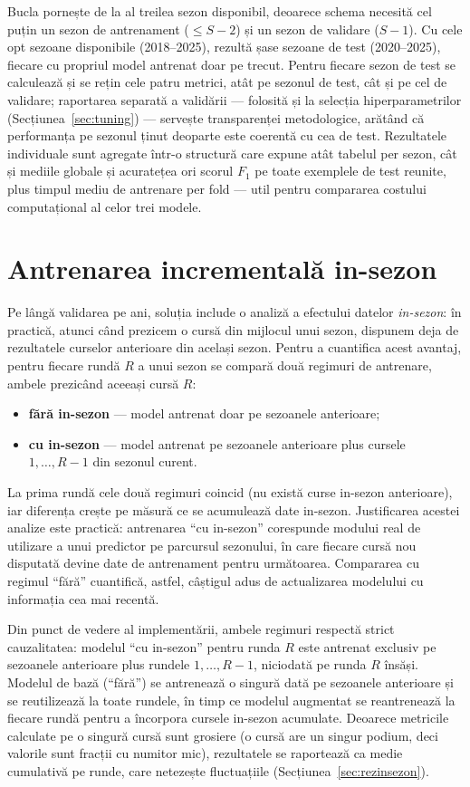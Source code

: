 \documentclass[12pt,a4paper]{report}
\begin{document}
Bucla pornește de la al treilea sezon disponibil, deoarece schema necesită cel puțin un sezon de
antrenament ($\leq S-2$) și un sezon de validare ($S-1$). Cu cele opt sezoane disponibile
(2018--2025), rezultă șase sezoane de test (2020--2025), fiecare cu propriul model antrenat doar pe
trecut. Pentru fiecare sezon de test se calculează și se rețin cele patru metrici, atât pe sezonul
de test, cât și pe cel de validare; raportarea separată a validării --- folosită și la selecția
hiperparametrilor (Secțiunea~\ref{sec:tuning}) --- servește transparenței metodologice, arătând că
performanța pe sezonul ținut deoparte este coerentă cu cea de test. Rezultatele individuale sunt
agregate într-o structură care expune atât tabelul per sezon, cât și mediile globale și acuratețea
ori scorul $F_1$ pe toate exemplele de test reunite, plus timpul mediu de antrenare per fold ---
util pentru compararea costului computațional al celor trei modele.

\section{Antrenarea incrementală in-sezon}
\label{sec:insezon}

Pe lângă validarea pe ani, soluția include o analiză a efectului datelor \emph{in-sezon}: în
practică, atunci când prezicem o cursă din mijlocul unui sezon, dispunem deja de rezultatele
curselor anterioare din același sezon. Pentru a cuantifica acest avantaj, pentru fiecare rundă $R$
a unui sezon se compară două regimuri de antrenare, ambele prezicând aceeași cursă $R$:
\begin{itemize}
  \item \textbf{fără in-sezon} --- model antrenat doar pe sezoanele anterioare;
  \item \textbf{cu in-sezon} --- model antrenat pe sezoanele anterioare plus cursele $1, \dots, R-1$
    din sezonul curent.
\end{itemize}
La prima rundă cele două regimuri coincid (nu există curse in-sezon anterioare), iar diferența
crește pe măsură ce se acumulează date in-sezon. Justificarea acestei analize este practică:
antrenarea ``cu in-sezon'' corespunde modului real de utilizare a unui predictor pe parcursul
sezonului, în care fiecare cursă nou disputată devine date de antrenament pentru următoarea.
Compararea cu regimul ``fără'' cuantifică, astfel, câștigul adus de actualizarea modelului cu
informația cea mai recentă.

Din punct de vedere al implementării, ambele regimuri respectă strict cauzalitatea: modelul ``cu
in-sezon'' pentru runda $R$ este antrenat exclusiv pe sezoanele anterioare plus rundele
$1, \dots, R-1$, niciodată pe runda $R$ însăși. Modelul de bază (``fără'') se antrenează o singură
dată pe sezoanele anterioare și se reutilizează la toate rundele, în timp ce modelul augmentat se
reantrenează la fiecare rundă pentru a încorpora cursele in-sezon acumulate. Deoarece metricile
calculate pe o singură cursă sunt grosiere (o cursă are un singur podium, deci valorile sunt
fracții cu numitor mic), rezultatele se raportează ca medie cumulativă pe runde, care netezește
fluctuațiile (Secțiunea~\ref{sec:rezinsezon}).
\end{document}
